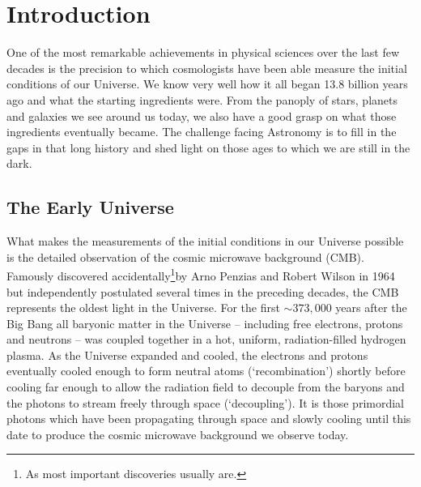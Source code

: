 
\chapter[Introduction]{Introduction}\label{ch:introduction}

One of the most remarkable achievements in physical sciences over the last few decades is the precision to which cosmologists have been able measure the initial conditions of our Universe. We know very well how it all began 13.8 billion years ago and what the starting ingredients were. From the panoply of stars, planets and galaxies we see around us today, we also have a good grasp on what those ingredients eventually became. The challenge facing Astronomy is to fill in the gaps in that long history and shed light on those ages to which we are still in the dark.

\section{The Early Universe}
What makes the measurements of the initial conditions in our Universe possible is the detailed observation of the cosmic microwave background (CMB). Famously discovered accidentally\footnote{As most important discoveries usually are.}by Arno Penzias and Robert Wilson in 1964 \citep{Penzias:1965es} but independently postulated several times in the preceding decades, the CMB represents the oldest light in the Universe. For the first $\sim 373,000$ years after the Big Bang all baryonic matter in the Universe -- including free electrons, protons and neutrons -- was coupled together in a hot, uniform, radiation-filled hydrogen plasma. As the Universe expanded and cooled, the electrons and protons eventually cooled enough to form neutral atoms (`recombination') shortly before cooling far enough to allow the radiation field to decouple from the baryons and the photons to stream freely through space (`decoupling'). It is those primordial photons which have been propagating through space and slowly cooling until this date to produce the cosmic microwave background we observe today.

